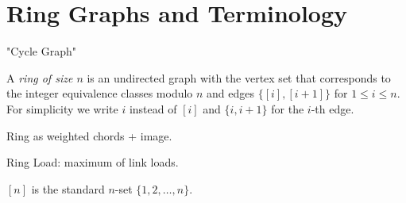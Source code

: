 \section{Ring Graphs and Terminology}

"Cycle Graph"

A \emph{ring of size $n$} is an undirected graph with the vertex set that corresponds to the integer equivalence classes modulo $n$ and edges $\{[i], [i+1]\}$ for $1 \leq i \leq n$.
For simplicity we write $i$ instead of $[i]$ and $\{i, i+1\}$ for the $i$-th edge. 

Ring as weighted chords + image.

Ring Load: maximum of link loads.

$[n]$ is the standard $n$-set $\{1, 2, \ldots, n\}$.


